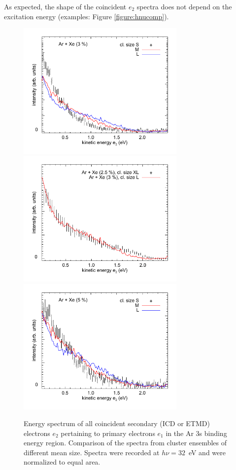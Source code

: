 \documentclass[journal=jpccck,manuscript=suppinfo]{achemso}
\begin{document}
As expected, the shape of the coincident $e_2$ spectra does not depend on the excitation energy (examples: Figure \ref{figure:hnucomp}).

\begin{figure}
 \centering
 \includegraphics[width=8.2cm]{pics/661_653_cs.pdf}
 \includegraphics[width=8.2cm]{pics/867_658_cs.pdf}
 \includegraphics[width=8.2cm]{pics/630_998_cs.pdf}
 \caption{
Energy spectrum of all coincident secondary (ICD or ETMD) electrons $e_2$ pertaining to primary electrons $e_1$ in the Ar 3s binding energy region. 
Comparison of the spectra from cluster ensembles of different mean size.
Spectra were recorded at $h\nu = 32$~eV and were normalized to equal area. 
 \label{figure:sizcomp}
 }
\end{figure}
\end{document}
